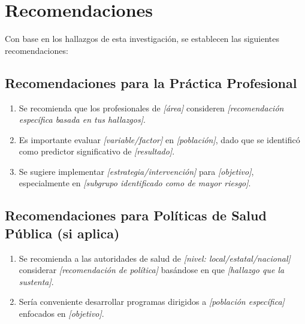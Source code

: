 \section{Recomendaciones}
\label{sec:recomendaciones}

Con base en los hallazgos de esta investigación, se establecen las siguientes recomendaciones:

\subsection{Recomendaciones para la Práctica Profesional}
\label{subsec:recomendaciones_practica}

\begin{enumerate}
    \item Se recomienda que los profesionales de \textit{[área]} consideren \textit{[recomendación específica basada en tus hallazgos]}.
    
    \item Es importante evaluar \textit{[variable/factor]} en \textit{[población]}, dado que se identificó como predictor significativo de \textit{[resultado]}.
    
    \item Se sugiere implementar \textit{[estrategia/intervención]} para \textit{[objetivo]}, especialmente en \textit{[subgrupo identificado como de mayor riesgo]}.
\end{enumerate}

\subsection{Recomendaciones para Políticas de Salud Pública (si aplica)}
\label{subsec:recomendaciones_politicas}

\begin{enumerate}
    \item Se recomienda a las autoridades de salud de \textit{[nivel: local/estatal/nacional]} considerar \textit{[recomendación de política]} basándose en que \textit{[hallazgo que la sustenta]}.
    
    \item Sería conveniente desarrollar programas dirigidos a \textit{[población específica]} enfocados en \textit{[objetivo]}.
\end{enumerate}


